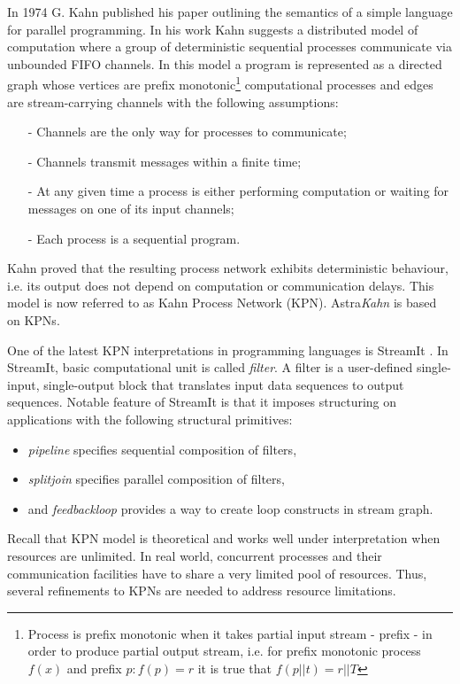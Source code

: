 In 1974 G. Kahn published his paper \cite{kahn74} outlining the semantics of a simple language for parallel programming. In his work Kahn suggests a distributed model of computation where a group of deterministic sequential processes communicate via unbounded FIFO channels. In this model a program is represented as a directed graph whose vertices are prefix monotonic\footnote{Process is prefix monotonic when it takes partial input stream - prefix - in order to produce partial output stream, i.e. for prefix monotonic process $f(x)$ and prefix $p : f(p)=r$ it is true that $f(p || t) = r || T$} computational processes and edges are stream-carrying channels with the following assumptions:
\begin{itemize}
\item[-]Channels are the only way for processes to communicate;
\item[-]Channels transmit messages within a finite time;
\item[-]At any given time a process is either performing computation or waiting for messages on one of its input channels;
\item[-]Each process is a sequential program.
\end{itemize}
Kahn proved that the resulting process network exhibits deterministic behaviour, i.e. its output does not depend on computation or communication delays. This model is now referred to as Kahn Process Network (KPN). Astra\emph{Kahn} is based on KPNs.

One of the latest KPN interpretations in programming languages is StreamIt \cite{streamit}. In StreamIt, basic computational unit is called \emph{filter}. A filter is a user-defined single-input, single-output block that translates input data sequences to output sequences. Notable feature of StreamIt is that it imposes structuring on applications with the following structural primitives:
\begin{itemize}
\item \emph{pipeline} specifies sequential composition of filters,
\item \emph{splitjoin} specifies parallel composition of filters,
\item and \emph{feedbackloop} provides a way to create loop constructs in stream graph.
\end{itemize}

Recall that KPN model is theoretical and works well under interpretation when resources are unlimited. In real world, concurrent processes and their communication facilities have to share a very limited pool of resources. Thus, several refinements to KPNs are needed to address resource limitations.

